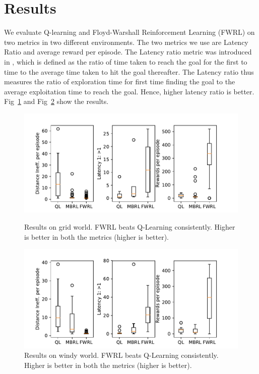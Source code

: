 \section{Results}

We evaluate Q-learning and Floyd-Warshall Reinforcement Learning (FWRL)  on two
metrics in two different environments. The two metrics we use are Latency Ratio
and average reward per episode. The Latency ratio metric was introduced in
\citet{MiPaViICLR2017}, which is defined as the ratio of time taken to reach the
goal for the first to time to the average time taken to hit the goal thereafter.
The Latency ratio thus measures the ratio of exploration time for first time
finding the goal to the average exploitation time to reach the goal. Hence,
higher latency ratio is better.
Fig~\ref{fig:ql-fw-grid-world-results} and
Fig~\ref{fig:ql-fw-windy-world-results} show the results.

\begin{figure}%
\includegraphics[width=\columnwidth]{./media/metrics-grid-world.pdf}\\
\caption{Results on grid world. FWRL beats Q-Learning consistently. Higher is
  better in both the metrics (higher is better).}
\label{fig:ql-fw-grid-world-results}%
\end{figure}
\begin{figure}
\includegraphics[width=\columnwidth]{./media/metrics-windy-world.pdf}%
\caption{Results on windy world. FWRL beats Q-Learning consistently. Higher is
  better in both the metrics (higher is better).}
\label{fig:ql-fw-windy-world-results}%
\end{figure}
